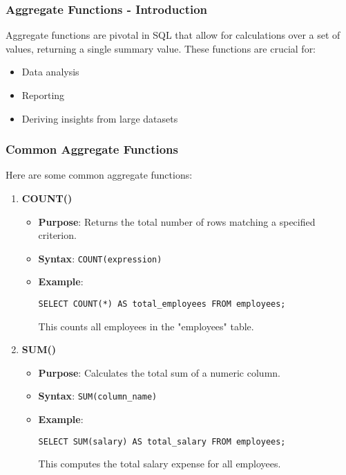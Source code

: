 \documentclass[aspectratio=169]{beamer}
\begin{document}
\begin{frame}[fragile]
    \frametitle{Aggregate Functions - Introduction}
    Aggregate functions are pivotal in SQL that allow for calculations over a set of values, returning a single summary value. 
    These functions are crucial for:
    \begin{itemize}
        \item Data analysis
        \item Reporting
        \item Deriving insights from large datasets
    \end{itemize}
\end{frame}

\begin{frame}[fragile]
    \frametitle{Common Aggregate Functions}
    Here are some common aggregate functions:

    \begin{enumerate}
        \item \textbf{COUNT()}
            \begin{itemize}
                \item \textbf{Purpose}: Returns the total number of rows matching a specified criterion.
                \item \textbf{Syntax}: \texttt{COUNT(expression)}
                \item \textbf{Example}:
                \begin{lstlisting}
SELECT COUNT(*) AS total_employees FROM employees;
                \end{lstlisting}
                This counts all employees in the "employees" table.
            \end{itemize}

        \item \textbf{SUM()}
            \begin{itemize}
                \item \textbf{Purpose}: Calculates the total sum of a numeric column.
                \item \textbf{Syntax}: \texttt{SUM(column_name)}
                \item \textbf{Example}:
                \begin{lstlisting}
SELECT SUM(salary) AS total_salary FROM employees;
                \end{lstlisting}
                This computes the total salary expense for all employees.
            \end{itemize}
    \end{enumerate}
\end{frame}
\end{document}
